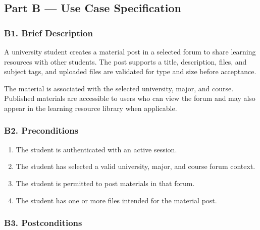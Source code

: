 \documentclass[12pt]{article}
\begin{document}
\subsection*{Part B --- Use Case Specification}
\par\medskip

\hypertarget{sec:b1-brief-description}{}
\subsubsection*{B1. Brief Description}
\par\medskip

A university student creates a material post in a selected forum to share learning resources with other students. The post supports a title, description, files, and subject tags, and uploaded files are validated for type and size before acceptance.
\par\medskip

The material is associated with the selected university, major, and course. Published materials are accessible to users who can view the forum and may also appear in the learning resource library when applicable.
\par\medskip

\hypertarget{sec:b2-preconditions}{}
\subsubsection*{B2. Preconditions}
\par\medskip

\begin{enumerate}
\item The student is authenticated with an active session.
\item The student has selected a valid university, major, and course forum context.
\item The student is permitted to post materials in that forum.
\item The student has one or more files intended for the material post.
\end{enumerate}
\par\medskip

\hypertarget{sec:b3-postconditions}{}
\subsubsection*{B3. Postconditions}
\par\medskip
\end{document}
